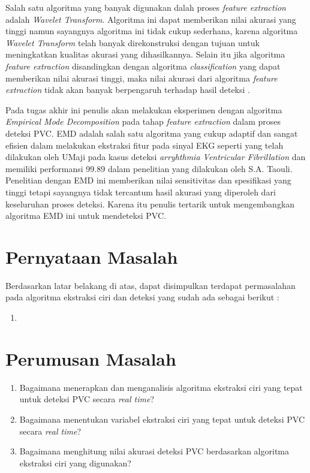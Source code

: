 Salah satu algoritma yang banyak digunakan dalah proses \textit{feature extraction} adalah \textit{Wavelet Transform}. Algoritma ini dapat memberikan nilai akurasi yang tinggi namun sayangnya algoritma ini tidak cukup sederhana, karena algoritma \textit{Wavelet Transform} telah banyak direkonstruksi dengan tujuan untuk meningkatkan kualitas akurasi yang dihasilkannya\cite{Ucuk}. Selain itu jika algoritma \textit{feature extraction} disandingkan dengan algoritma \textit{classification} yang dapat memberikan nilai akurasi tinggi, maka nilai akurasi dari algoritma \textit{feature extraction} tidak akan banyak berpengaruh terhadap hasil deteksi \cite{yasinKaya}.

Pada tugas akhir ini penulis akan melakukan eksperimen dengan algoritma  \textit{Empirical Mode Decomposition} pada tahap \textit{feature extraction} dalam proses deteksi PVC. EMD adalah salah satu algoritma yang cukup adaptif dan sangat efisien dalam melakukan ekstraksi fitur pada sinyal EKG seperti yang telah dilakukan oleh UMaji\cite{UMaji} pada kasus deteksi \textit{arryhthmia Ventricular Fibrillation} dan memiliki performansi 99.89 dalam penelitian yang dilakukan oleh S.A. Taouli\cite{s.a.Taouli}. Penelitian dengan EMD ini memberikan nilai sensitivitas dan spesifikasi yang tinggi tetapi sayangnya tidak tercantum hasil akurasi yang diperoleh dari keseluruhan proses deteksi. Karena itu penulis tertarik untuk mengembangkan algoritma EMD ini untuk mendeteksi PVC. 

\section{Pernyataan Masalah}
Berdasarkan latar belakang di atas, dapat disimpulkan terdapat permasalahan pada algoritma ekstraksi ciri dan deteksi yang sudah ada sebagai berikut :
\begin{enumerate}
	\item
\end{enumerate}

\section{Perumusan Masalah}
\begin{enumerate}
    \item Bagaimana menerapkan dan menganalisis algoritma ekstraksi ciri yang tepat untuk deteksi PVC secara \textit{real time}?
    \item Bagaimana menentukan variabel ekstraksi ciri yang tepat untuk deteksi PVC secara \textit{real time}?
    \item Bagaimana menghitung nilai akurasi deteksi PVC berdasarkan algoritma ekstraksi ciri yang digunakan?
\end{enumerate}

